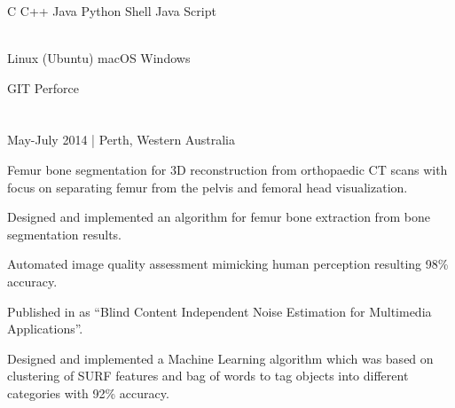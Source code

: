 \documentclass[]{deedy-resume-openfont}
\begin{document}
\begin{minipage}[t]{0.48\textwidth}

\section{}
\hline
\vspace{2mm}
 \\
C \textbullet{} C++ \textbullet{} Java \textbullet{} Python \textbullet{} Shell \textbullet{} Java Script  \\
\vspace{1.5mm}

  \\
Linux (Ubuntu) \textbullet{} macOS \textbullet{} Windows\\
\vspace{1.5mm}

GIT \textbullet{} Perforce \\



\section{}
\hline
\vspace{2mm}
May-July 2014 | Perth, Western Australia \\
\vspace{3mm}

\begin{tightemize}
 \item Femur bone segmentation for 3D reconstruction from orthopaedic CT scans with focus on separating femur from the pelvis and femoral head visualization.
 \item Designed and implemented an algorithm for femur bone extraction from bone segmentation results.
\end{tightemize}
\sectionsep

\begin{tightemize}

 \item Automated image quality assessment mimicking human perception resulting 98\% accuracy.
 \item Published in  as “Blind Content Independent Noise Estimation for Multimedia Applications”.
\end{tightemize}
\sectionsep
{}
Designed and implemented a Machine Learning algorithm which was based on clustering of SURF features and bag of words to tag objects into different categories with 92\% accuracy.


\end{minipage}
\end{document}
